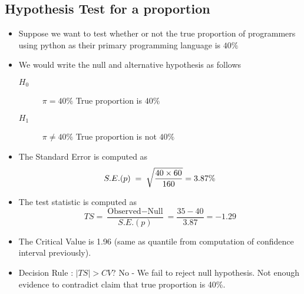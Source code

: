 

\subsection{Hypothesis Test for a proportion }

\begin{itemize}
\item Suppose we want to test whether or not the true proportion of programmers using python as their primary programming language is $40\%$
\item We would write the null and alternative hypothesis as follows
\begin{description}
\item[$H_0$] $\pi = 40\%$ True proportion is $40\%$
\item[$H_1$] $\pi \neq 40\%$ True proportion is not $40\%$
\end{description}
\end{itemize}

\begin{itemize}
\item The Standard Error is computed as
\[S.E.(p) \;=\; \sqrt{ {40 \times 60 \over 160 }} =  3.87\%\]
\item The test statistic is computed as
\[TS = \frac{\mbox{Observed} - \mbox{Null}}{S.E.(p)} = \frac{35-40}{3.87} = -1.29\]
\item The Critical Value is 1.96 (same as quantile from computation of confidence interval previously).
\item Decision Rule : $|TS| > CV$? No - We fail to reject null hypothesis. Not enough evidence to contradict claim that true proportion is 40\%.
\end{itemize}





